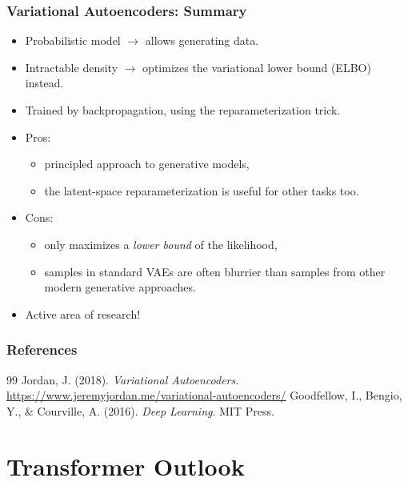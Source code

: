 \begin{frame}
\frametitle{Variational Autoencoders: Summary}
\begin{itemize}
  \item Probabilistic model $\rightarrow$ allows generating data.
  \item Intractable density $\rightarrow$ optimizes the variational lower bound (ELBO) instead.
  \item Trained by backpropagation, using the reparameterization trick.
  \item Pros:
    \begin{itemize}
      \item principled approach to generative models,
      \item the latent-space reparameterization is useful for other tasks too.
    \end{itemize}
  \item Cons:
    \begin{itemize}
      \item only maximizes a \textit{lower bound} of the likelihood,
      \item samples in standard VAEs are often blurrier than samples from other modern generative approaches.
    \end{itemize}
  \item Active area of research!
\end{itemize}
\end{frame}
\begin{vbframe}
\frametitle{References}
\footnotesize{
\begin{thebibliography}{99}
 Jordan, J. (2018). \textit{Variational Autoencoders}. \url{https://www.jeremyjordan.me/variational-autoencoders/}
 Goodfellow, I., Bengio, Y., \& Courville, A. (2016). \textit{Deep Learning}. MIT Press.
\end{thebibliography}
}
\end{vbframe}

\section{Transformer Outlook}

